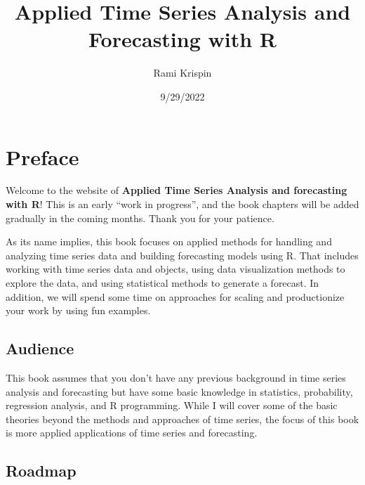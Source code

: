 \documentclass[
  letterpaper,
  DIV=11,
  numbers=noendperiod]{scrreprt}
\title{Applied Time Series Analysis and Forecasting with R}
\author{Rami Krispin}
\date{9/29/2022}
\renewcommand*\contentsname{Table of contents}
\newcommand\contentsname{Table of contents}
\begin{document}
\maketitle
\ifdefined\Shaded\renewenvironment{Shaded}{\begin{tcolorbox}[frame hidden, breakable, sharp corners, enhanced, borderline west={3pt}{0pt}{shadecolor}, boxrule=0pt, interior hidden]}{\end{tcolorbox}}\fi

\renewcommand*\contentsname{Table of contents}
{
\hypersetup{linkcolor=}
\setcounter{tocdepth}{2}
\tableofcontents
}

\hypertarget{preface}{%
\chapter*{Preface}\label{preface}}

Welcome to the website of \textbf{Applied Time Series Analysis and
forecasting with R}! This is an early ``work in progress'', and the book
chapters will be added gradually in the coming months. Thank you for
your patience.

As its name implies, this book focuses on applied methods for handling
and analyzing time series data and building forecasting models using R.
That includes working with time series data and objects, using data
visualization methods to explore the data, and using statistical methods
to generate a forecast. In addition, we will spend some time on
approaches for scaling and productionize your work by using fun
examples.

\hypertarget{audience}{%
\section*{Audience}\label{audience}}

This book assumes that you don't have any previous background in time
series analysis and forecasting but have some basic knowledge in
statistics, probability, regression analysis, and R programming. While I
will cover some of the basic theories beyond the methods and approaches
of time series, the focus of this book is more applied applications of
time series and forecasting.

\hypertarget{roadmap}{%
\section*{Roadmap}\label{roadmap}}
\end{document}
